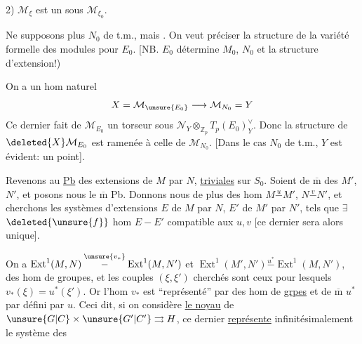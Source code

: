 2) $\mathcal M_\xi$ est un 
 sous $\mathcal M_{\xi_0}$.

Ne supposons plus $N_0$ de t.m., mais .
On veut préciser la structure de la variété formelle des
modules pour $E_0$. [NB. $E_0$ détermine 
$M_0$, $N_0$ et la structure d'extension!)

On a un hom naturel
\[
X=\mathcal M_{\unsure{E_0}}\longrightarrow\mathcal M_{N_0}=Y
\]
Ce dernier fait de $\mathcal M_{E_0}$ un
 torseur 
sous $\mathcal N_Y\otimes_{\mathbb Z_p}T_p(E_0)^\vee_Y$.
Donc la structure de $\deleted{X}\mathcal M_{E_0}$ est ramenée
à celle de $\mathcal M_{N_0}$.
[Dans le cas $N_0$ de t.m., $Y$ est évident: un point].

Revenons au \uline{Pb} des extensions de $M$ par $N$,
\uline{triviales} sur $S_0$. Soient de $\overline{\mathrm m}$ des $M'$, $N'$, et
posons nous le $\overline{\mathrm m}$ Pb. Donnons nous de plus des hom
$M\overset{u}{-}M'$, $N\overset{v}{-}N'$, et cherchons les
systèmes d'extensions $E$ de $M$ par $N$, $E'$ de $M'$ par $N'$,
 tels que $\exists$
$\deleted{\unsure{f}}$ hom $E-E'$ compatible aux $u,v$
[ce dernier sera alors unique].

On a $\operatorname{Ext}^1(M,N)\overset{\unsure{v_*}}{-}
\operatorname{Ext}^1(M,N')$ et
$\operatorname{Ext}^1(M',N')\overset{u^*}{-}\operatorname{Ext}^1(M,N')$,
des hom de groupes, 
et les couples $(\xi,\xi')$ cherchés sont ceux pour lesquels
$v_*(\xi)=u^*(\xi')$. Or l'hom $v_*$ est
``représenté'' par des hom de \uline{grpes}
et de $\overline{\mathrm m}$ $u^*$ par
défini par $u$. Ceci dit, si on considère
\uline{le noyau}  de 
$\unsure{G|C}\times\unsure{G'|C'}\rightrightarrows H$,
 ce dernier
\uline{représente} infinitésimalement le système des

